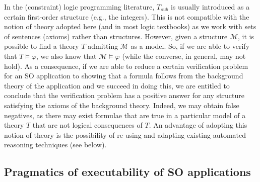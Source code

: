 \documentclass[conference]{IEEEtran}
\begin{document}
\begin{LONG}
In the (constraint) logic programming literature, $T_\mathit{sub}$ is usually
introduced as a certain first-order structure (e.g., the integers).
This is not compatible with the notion of theory adopted here (and in
most logic textbooks) as we work with sets of sentences (axioms)
rather than structures.  However, given a structure $\mathcal{M}$,
it is possible to find a theory $T$ admitting $\mathcal{M}$ as a
model.  So, if we are able to verify that $T\models \varphi$, we also
know that $\mathcal{M}\models \varphi$ (while the converse, in
general, may not hold).  As a consequence, if we are able to reduce a
certain verification problem for an SO application to showing that a
formula follows from the background theory of the application and we
succeed in doing this, we are entitled to conclude that the
verification problem has a positive answer for any structure
satisfying the axioms of the background theory.  Indeed, we may obtain
false negatives, as there may exist formulae that are true in a
particular model of a theory $T$ that are not logical consequences of
$T$.  An advantage of adopting this notion of theory is the
possibility of re-using and adapting existing automated reasoning
techniques (see below).


\subsection{Pragmatics of executability of SO applications}\label{sec:pragmatics-executability}


\end{LONG}
\end{document}
